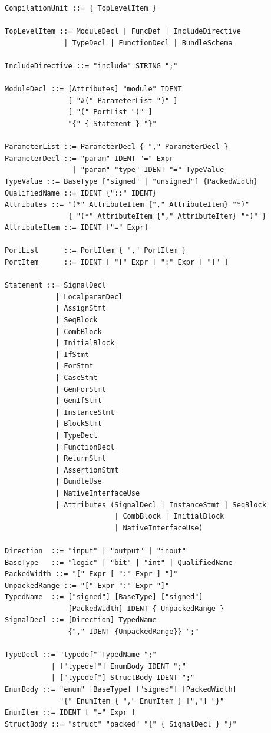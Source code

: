 \documentclass[lang=en,11pt]{elegantbook}
\begin{document}
\begin{lstlisting}[basicstyle=\ttfamily\footnotesize,
  keywordstyle={},
  frame=single,
  backgroundcolor=\color{codebg},
  escapechar=@]
CompilationUnit ::= { TopLevelItem }

TopLevelItem ::= ModuleDecl | FuncDef | IncludeDirective
              | TypeDecl | FunctionDecl | BundleSchema

IncludeDirective ::= "include" STRING ";"

ModuleDecl ::= [Attributes] "module" IDENT
               [ "#(" ParameterList ")" ]
               [ "(" PortList ")" ]
               "{" { Statement } "}"

ParameterList ::= ParameterDecl { "," ParameterDecl }
ParameterDecl ::= "param" IDENT "=" Expr
                | "param" "type" IDENT "=" TypeValue
TypeValue ::= BaseType ["signed" | "unsigned"] {PackedWidth}
QualifiedName ::= IDENT {"::" IDENT}
Attributes ::= "(*" AttributeItem {"," AttributeItem} "*)"
               { "(*" AttributeItem {"," AttributeItem} "*)" }
AttributeItem ::= IDENT ["=" Expr]

PortList      ::= PortItem { "," PortItem }
PortItem      ::= IDENT [ "[" Expr [ ":" Expr ] "]" ]

Statement ::= SignalDecl
            | LocalparamDecl
            | AssignStmt
            | SeqBlock
            | CombBlock
            | InitialBlock
            | IfStmt
            | ForStmt
            | CaseStmt
            | GenForStmt
            | GenIfStmt
            | InstanceStmt
            | BlockStmt
            | TypeDecl
            | FunctionDecl
            | ReturnStmt
            | AssertionStmt
            | BundleUse
            | NativeInterfaceUse
            | Attributes (SignalDecl | InstanceStmt | SeqBlock
                          | CombBlock | InitialBlock
                          | NativeInterfaceUse)

Direction  ::= "input" | "output" | "inout"
BaseType   ::= "logic" | "bit" | "int" | QualifiedName
PackedWidth ::= "[" Expr [ ":" Expr ] "]"
UnpackedRange ::= "[" Expr ":" Expr "]"
TypedName  ::= ["signed"] [BaseType] ["signed"]
               [PackedWidth] IDENT { UnpackedRange }
SignalDecl ::= [Direction] TypedName
               {"," IDENT {UnpackedRange}} ";"

TypeDecl ::= "typedef" TypedName ";"
           | ["typedef"] EnumBody IDENT ";"
           | ["typedef"] StructBody IDENT ";"
EnumBody ::= "enum" [BaseType] ["signed"] [PackedWidth]
             "{" EnumItem { "," EnumItem } [","] "}"
EnumItem ::= IDENT [ "=" Expr ]
StructBody ::= "struct" "packed" "{" { SignalDecl } "}"


\end{lstlisting}
\end{document}
